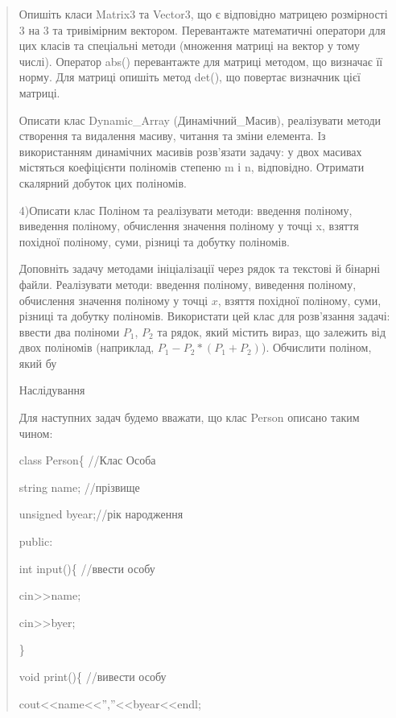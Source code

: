 \documentclass[]{article}
\begin{document}
\begin{quote}
\protect\hypertarget{_Hlk65950809}{}{}Опишіть класи Matrix3 та Vector3,
що є відповідно матрицею розмірності 3 на 3 та тривімірним вектором.
Перевантажте математичні оператори для цих класів та спеціальні методи
(множення матриці на вектор у тому числі). Оператор abs() перевантажте
для матриці методом, що визначає її норму. Для матриці опишіть метод
det(), що повертає визначник цієї матриці.

Описати клас Dynamic\_Array (Динамічний\_Масив), реалізувати методи
створення та видалення масиву, читання та зміни елемента. Із
використанням динамічних масивів розв'язати задачу: у двох масивах
містяться коефіцієнти поліномів степеню m і n, відповідно. Отримати
скалярний добуток цих поліномів.

\protect\hypertarget{__DdeLink__7879_2123939799}{}{}4)\protect\hypertarget{_Hlk65950764}{}{}Описати
клас Поліном та реалізувати методи: введення поліному, виведення
поліному, обчислення значення поліному у точці x, взяття похідної
поліному, суми, різниці та добутку поліномів.

Доповніть задачу методами ініціалізації через рядок та текстові й
бінарні файли. Реалізувати методи: введення поліному, виведення
поліному, обчислення значення поліному у точці \(x\), взяття похідної
поліному, суми, різниці та добутку поліномів. Використати цей клас для
розв'язання задачі: ввести два поліноми \(P_{1}\), \(P_{2}\) та рядок,
який містить вираз, що залежить від двох поліномів (наприклад,
\(P_{1} - P_{2}*(P_{1} + P_{2})\)). Обчислити поліном, який бу

\protect\hypertarget{_Hlk65950979}{}{}

Наслідування

\protect\hypertarget{_Hlk65951291}{}{}Для наступних задач будемо
вважати, що клас Person описано таким чином:

class Person\{ //Клас Особа

string name; //прізвище

unsigned byear;//рік народження

public:

int input()\{ //ввести особу

cin\textgreater{}\textgreater{}name;

cin\textgreater{}\textgreater{}byer;

\}

void print()\{ //вивести особу

cout\textless{}\textless{}name\textless{}\textless{}'',''\textless{}\textless{}byear\textless{}\textless{}endl;


\end{quote}
\end{document}
